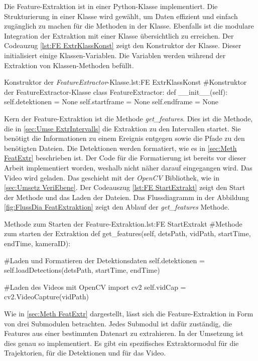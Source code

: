 Die Feature-Extraktion ist in einer Python-Klasse implementiert. Die Strukturierung in einer Klasse wird gewählt, um Daten effizient und einfach zugänglich zu machen für die Methoden in der Klasse. Ebenfalls ist die modulare Integration der Extraktion mit einer Klasse übersichtlich zu erreichen. Der Codeauzug \ref{lst:FE ExtrKlassKonst} zeigt den Konstruktor der Klasse. Dieser initialisiert einige Klassen-Variablen. Die Variablen werden während der Extraktion von Klassen-Methoden befüllt. 

\begin{pythoncode}{Konstruktor der \textit{FeatureExtractor}-Klasse.}{lst:FE ExtrKlassKonst}
#Konstruktor der FeatureExtractor-Klasse
class FeatureExtractor:
    def __init__(self):
        self.detektionen = None
        self.startframe = None
        self.endframe = None
\end{pythoncode}

Kern der Feature-Extraktion ist die Methode \textit{get\_features}. Dies ist die Methode, die in \autoref{sec:Umse ExtrIntervalls} die Extraktion zu den Intervallen startet. Sie benötigt die Informationen zu einem Ereignis entgegen sowie die Pfade zu den benötigten Dateien. Die Detektionen werden formatiert, wie es in \autoref{sec:Meth FeatExtr} beschrieben ist. Der Code für die Formatierung ist bereits vor dieser Arbeit implementiert worden, weshalb nicht näher darauf eingegangen wird. Das Video wird geladen. Das geschieht mit der \textit{OpenCV} Bibliothek, wie in \autoref{sec:Umsetz VeriEbene}. Der Codeauszug \ref{lst:FE StartExtrakt} zeigt den Start der Methode und das Laden der Dateien. Das Flussdiagramm in der Abbildung \ref{fig:FlussDia FeatExtraktion} zeigt den Ablauf der \textit{get\_features} Methode.

\begin{pythoncode}{Methode zum Starten der Feature-Extraktion.}{lst:FE StartExtrakt}
#Methode zum starten der Extraktion
def get_features(self, detsPath, vidPath, startTime, endTime, kameraID):

    #Laden und Formatieren der Detektionsdaten
    self.detektionen = self.loadDetections(detsPath, startTime, endTime)

    #Laden des Videos mit OpenCV
    import cv2
    self.vidCap = cv2.VideoCapture(vidPath)

\end{pythoncode}

Wie in \autoref{sec:Meth FeatExtr} dargestellt, lässt sich die Feature-Extraktion in Form von drei Submodulen betrachten. Jedes Submodul ist dafür zuständig, die Features aus einer bestimmten Datenart zu extrahieren. In der Umsetzung ist dies genau so implementiert. Es gibt ein spezifisches Extraktormodul für die Trajektorien, für die Detektionen und für das Video. \par 

